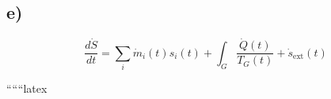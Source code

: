 

\subsection*{e)}

\[
\frac{d\dot{S}}{dt} = \sum_i \dot{m}_i (t) s_i (t) + \int_{G} \frac{\dot{Q}(t)}{T_G (t)} + \dot{s}_{\text{ext}}(t)
\]

``````latex